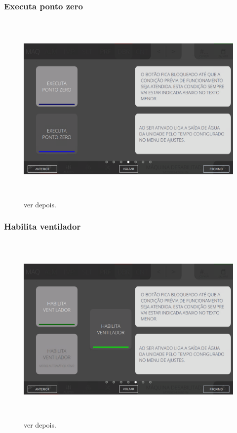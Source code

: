 \newpage
\thispagestyle{fancy}
\vspace*{\fill}
\subsubsection{\small{Executa ponto zero}}
\begin{figure}[h]
  \centering
  \includegraphics[width=576px,height=360px]{src/imagesFlexo/07-fold/commands/e-4.png}
  \caption{ver depois.}
   \label{}
\end{figure}
\vspace*{\fill}

\newpage
\thispagestyle{fancy}
\vspace*{\fill}
\subsubsection{\small{Habilita ventilador}}
\begin{figure}[h]
  \centering
  \includegraphics[width=576px,height=360px]{src/imagesFlexo/07-fold/commands/e-5.png}
  \caption{ver depois.}
   \label{}
\end{figure}
\vspace*{\fill}

